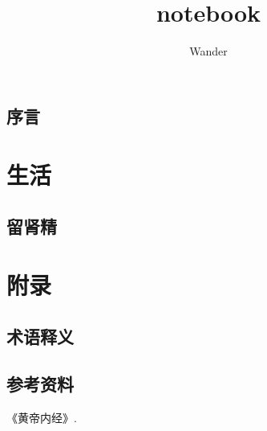 \documentclass[12pt,oneside]{book}
\title{notebook}
\author{Wander}
\begin{document}
\makemytitle



\frontmatter 
{}
\chapter*{序言}


\setcounter{tocdepth}{2}    
\tableofcontents



\mainmatter



\part{生活}



\chapter{留肾精}


\appendix
\part{附录}
\chapter{术语释义}



\backmatter
\chapter*{参考资料}
\begin{thebibliography}{99}
 《黄帝内经》.


\end{thebibliography}
\end{document}
